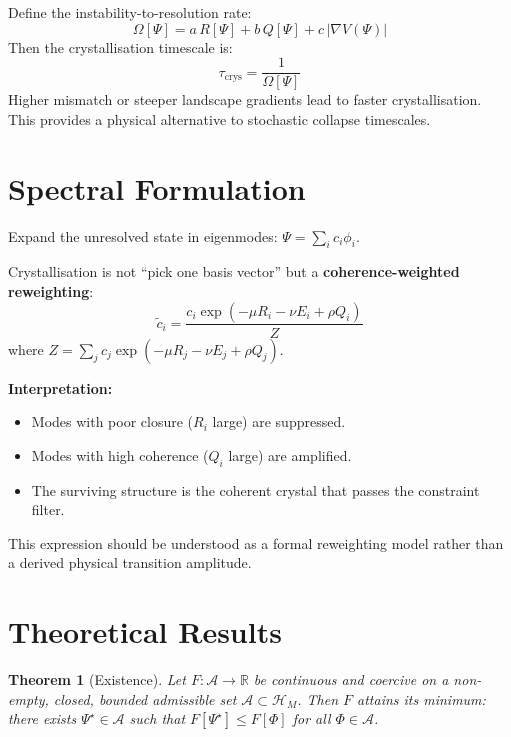 \documentclass[12pt]{article}
\newtheorem{theorem}{Theorem}
\begin{document}
Define the instability-to-resolution rate:
\begin{equation}
\Omega[\Psi] = a\,R[\Psi] + b\,Q[\Psi] + c\,|\nabla V(\Psi)|
\end{equation}
Then the crystallisation timescale is:
\begin{equation}
\tau_{\mathrm{crys}} = \frac{1}{\Omega[\Psi]}
\end{equation}
Higher mismatch or steeper landscape gradients lead to faster crystallisation. This provides a physical alternative to stochastic collapse timescales.

\section{Spectral Formulation}

Expand the unresolved state in eigenmodes: $\Psi = \sum_i c_i \phi_i$.

Crystallisation is not ``pick one basis vector'' but a \textbf{coherence-weighted reweighting}:
\begin{equation}
\tilde{c}_i = \frac{c_i \exp(-\mu R_i - \nu E_i + \rho Q_i)}{Z}
\end{equation}
where $Z = \sum_j c_j \exp(-\mu R_j - \nu E_j + \rho Q_j)$.

\textbf{Interpretation:}
\begin{itemize}
    \item Modes with poor closure ($R_i$ large) are suppressed.
    \item Modes with high coherence ($Q_i$ large) are amplified.
    \item The surviving structure is the coherent crystal that passes the constraint filter.
\end{itemize}

This expression should be understood as a formal reweighting model rather than a derived physical transition amplitude.

\section{Theoretical Results}

\begin{theorem}[Existence]
Let $F: \mathcal{A} \to \mathbb{R}$ be continuous and coercive on a non-empty, closed, bounded admissible set $\mathcal{A} \subset \mathcal{H}_M$. Then $F$ attains its minimum: there exists $\Psi^{\star} \in \mathcal{A}$ such that $F[\Psi^{\star}] \leq F[\Phi]$ for all $\Phi \in \mathcal{A}$.
\end{theorem}
\end{document}
